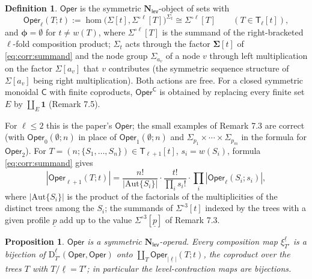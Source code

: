 \documentclass[12pt]{article}
\theoremstyle{plain}
\newtheorem{cproposition}[ctheorem]{Proposition}
\theoremstyle{definition}
\newtheorem{cdefinition}[ctheorem]{Definition}
\theoremstyle{remark}
\newcommand{\Nl}{\mathbf{N}_{\mathsf{lev}}}
\newcommand{\Oper}{\mathsf{Oper}}
\newcommand{\ptC}{\boldsymbol{\phi}}
\newcommand{\Tr}{\mathsf{T}}
\newcommand{\wt}{w}
\newcommand{\Dm}{\mathrm{D}}
\begin{document}
\begin{cdefinition}\label{cdef:oper}
$\Oper$ is the symmetric $\Nl$-object of sets with
\[\Oper_\ell(T;t):=\hom\big(\Sigma[t],\Sigma^{\circ\ell}[T]\big)^{\Sigma_t}\cong\Sigma^{\circ\ell}[T]\qquad(T\in\Tr_\ell[t]),\]
and $\ptC=\emptyset$ for $t\neq\wt(T)$, where $\Sigma^{\circ\ell}[T]$ is the summand of the right-bracketed $\ell$-fold composition product; $\Sigma_t$ acts through the factor $\mathbf\Sigma[t]$ of \eqref{eq:corr:summand} and the node group $\Sigma_{a_v}$ of a node $v$ through left multiplication on the factor $\Sigma[a_v]$ that $v$ contributes (the symmetric sequence structure of $\Sigma[a_v]$ being right multiplication). Both actions are free. For a closed symmetric monoidal $\mathsf C$ with finite coproducts, $\Oper^{\mathsf C}$ is obtained by replacing every finite set $E$ by $\coprod_E\mathbf1$ (Remark 7.5).
\end{cdefinition}

For $\ell\leq2$ this is the paper's $\Oper$; the small examples of Remark 7.3 are correct (with $\Oper_0(\emptyset;n)$ in place of $\Oper_1(\emptyset;n)$ and $\Sigma_{p_1}\times\cdots\times\Sigma_{p_m}$ in the formula for $\Oper_2$). For $T=(n;\{S_1,\dots,S_n\})\in\Tr_{\ell+1}[t]$, $s_i=\wt(S_i)$, formula \eqref{eq:corr:summand} gives
\begin{equation}\label{eq:corr:opercount}
|\Oper_{\ell+1}(T;t)|=\frac{n!}{|\mathrm{Aut}\{S_i\}|}\cdot\frac{t!}{\prod_is_i!}\cdot\prod_i|\Oper_\ell(S_i;s_i)|,
\end{equation}
where $|\mathrm{Aut}\{S_i\}|$ is the product of the factorials of the multiplicities of the distinct trees among the $S_i$; the summands of $\Sigma^{\circ3}[t]$ indexed by the trees with a given profile $\underline p$ add up to the value $\Sigma^{\circ3}[\underline p]$ of Remark 7.3.

\begin{cproposition}\label{cprop:oper}
$\Oper$ is a symmetric $\Nl$-operad. Every composition map $\xi^{\underline\ell}_{T'}$ is a bijection of $\Dm^{\underline\ell}_{T'}(\Oper,\Oper)$ onto $\coprod_{T}\Oper_{|\underline\ell|}(T;t)$, the coproduct over the trees $T$ with $T/\underline\ell=T'$; in particular the level-contraction maps are bijections.
\end{cproposition}
\end{document}
